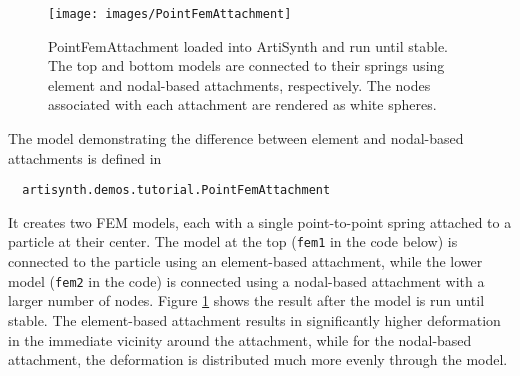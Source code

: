 \begin{figure}[ht]
\centering
{}
\texttt{[image: images/PointFemAttachment]}
\caption{PointFemAttachment loaded into ArtiSynth and run until stable.
The top and bottom models are connected to their springs using element
and nodal-based attachments, respectively.  The nodes associated with
each attachment are rendered as white spheres.}
\label{fig:fem:pointFemAttachment}
\end{figure}

The model demonstrating the difference between element and
nodal-based attachments is defined in
%
\begin{verbatim}
  artisynth.demos.tutorial.PointFemAttachment
\end{verbatim}
%
It creates two FEM models, each
with a single point-to-point spring attached to a particle at their
center. The model at the top ({\tt fem1} in the code below) is
connected to the particle using an element-based attachment, while the
lower model ({\tt fem2} in the code) is connected using a nodal-based
attachment with a larger number of nodes. Figure
\ref{fig:fem:pointFemAttachment} shows the result after the model is
run until stable. The element-based attachment results in
significantly higher deformation in the immediate vicinity around the
attachment, while for the nodal-based attachment, the deformation is
distributed much more evenly through the model.

